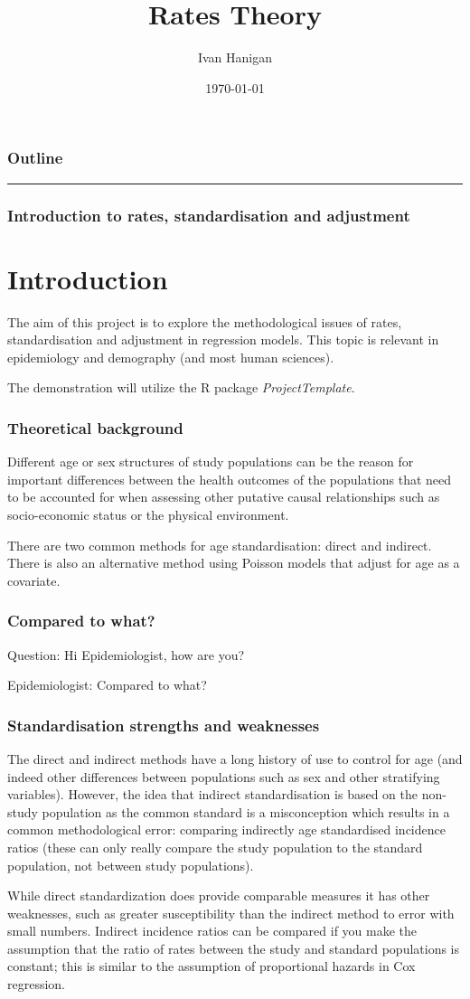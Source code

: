 \documentclass[a4paper]{beamer}
\title{Rates Theory}
\author{Ivan Hanigan}
\date{\today}
\begin{document}
\maketitle

\begin{frame}
\frametitle{Outline}
\setcounter{tocdepth}{3}
\tableofcontents
\end{frame}
\hrule

\begin{frame}
\frametitle{Introduction to rates, standardisation and adjustment}
\label{sec-1}

\section{Introduction}
The aim of this project is to explore the methodological issues of rates, standardisation and adjustment in regression models.
This topic is relevant in epidemiology and demography (and most human sciences).

The demonstration will utilize the R package \emph{ProjectTemplate}.
\end{frame}
\begin{frame}
\frametitle{Theoretical background}
\label{sec-2}

Different age or sex structures of study populations can be the reason for important differences between the health outcomes of the populations that need to be accounted for when assessing other putative causal relationships such as socio-economic status or the physical environment. 

There are two common methods for age standardisation: direct and indirect. There is also an alternative method using Poisson models that adjust for age as a covariate.
\end{frame}
\begin{frame}
\frametitle{Compared to what?}
\label{sec-3}

Question: Hi Epidemiologist, how are you?

Epidemiologist: Compared to what?
\end{frame}
\begin{frame}
\frametitle{Standardisation strengths and weaknesses}
\label{sec-4}

The direct and indirect methods have a long history of use to control for age (and indeed other differences between populations such as sex and other stratifying variables).  However, the idea that indirect standardisation is based on the non-study population as the common standard is a misconception which results in a common methodological error: comparing indirectly age standardised incidence ratios (these can only really compare the study population to the standard population, not between study populations). 

While direct standardization does provide comparable measures it has other weaknesses, such as greater susceptibility than the indirect method to error with small numbers. Indirect incidence ratios can be compared if you make the assumption that the ratio of rates between the study and standard populations is constant; this is similar to the assumption of proportional hazards in Cox regression. 
\end{frame}
\end{document}
